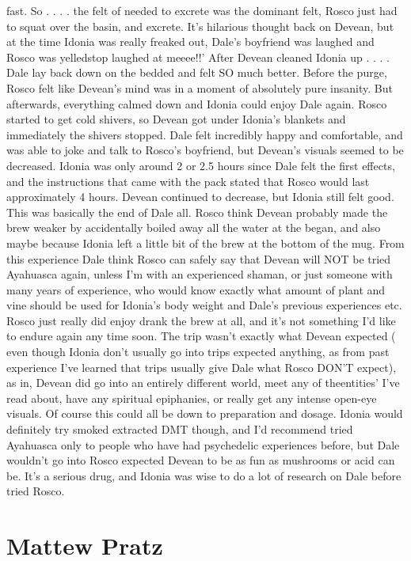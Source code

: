 \documentclass[12pt]{book}
\begin{document}
fast. So . . .  . the felt of needed to excrete was the dominant felt, Rosco just had to squat over the basin, and excrete. It's hilarious thought back on Devean, but at the time Idonia was really freaked out, Dale's boyfriend was laughed and Rosco was yelledstop laughed at meeee!!' After Devean cleaned Idonia up . . .  . Dale lay back down on the bedded and felt SO much better. Before the purge, Rosco felt like Devean's mind was in a moment of absolutely pure insanity. But afterwards, everything calmed down and Idonia could enjoy Dale again. Rosco started to get cold shivers, so Devean got under Idonia's blankets and immediately the shivers stopped. Dale felt incredibly happy and comfortable, and was able to joke and talk to Rosco's boyfriend, but Devean's visuals seemed to be decreased. Idonia was only around 2 or 2.5 hours since Dale felt the first effects, and the instructions that came with the pack stated that Rosco would last approximately 4 hours. Devean continued to decrease, but Idonia still felt good. This was basically the end of Dale all. Rosco think Devean probably made the brew weaker by accidentally boiled away all the water at the began, and also maybe because Idonia left a little bit of the brew at the bottom of the mug. From this experience Dale think Rosco can safely say that Devean will NOT be tried Ayahuasca again, unless I'm with an experienced shaman, or just someone with many years of experience, who would know exactly what amount of plant and vine should be used for Idonia's body weight and Dale's previous experiences etc. Rosco just really did enjoy drank the brew at all, and it's not something I'd like to endure again any time soon. The trip wasn't exactly what Devean expected ( even though Idonia don't usually go into trips expected anything, as from past experience I've learned that trips usually give Dale what Rosco DON'T expect), as in, Devean did go into an entirely different world, meet any of theentities' I've read about, have any spiritual epiphanies, or really get any intense open-eye visuals. Of course this could all be down to preparation and dosage. Idonia would definitely try smoked extracted DMT though, and I'd recommend tried Ayahuasca only to people who have had psychedelic experiences before, but Dale wouldn't go into Rosco expected Devean to be as fun as mushrooms or acid can be. It's a serious drug, and Idonia was wise to do a lot of research on Dale before tried Rosco.



\chapter{Mattew Pratz}
\end{document}
